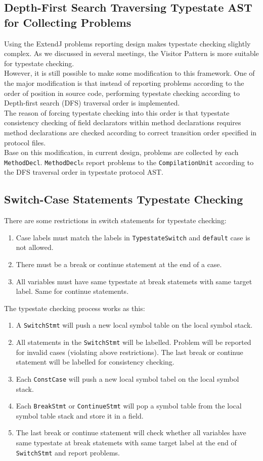 \documentclass[]{article}
\begin{document}
\subsection{Depth-First Search Traversing Typestate AST for Collecting Problems}
Using the ExtendJ problems reporting design makes typestate checking slightly complex. As we discussed in several meetings, the Visitor Pattern is more suitable for typestate checking. \\[0.2cm]
However, it is still possible to make some modification to this framework. One of the major modification is that instead of reporting problems according to the order of position in source code, performing typestate checking according to Depth-first search (DFS) traversal order is implemented. \\[0.2cm]
The reason of forcing typestate checking into this order is that typestate consistency checking of field declarators within method declarations requires method declarations are checked according to correct transition order specified in protocol files. \\[0.2cm]
Base on this modification, in current design, problems are collected by each \texttt{MethodDecl}. \texttt{MethodDecl}s report problems to the \texttt{CompilationUnit} according to the DFS traversal order in typestate protocol AST. 

\subsection{Switch-Case Statements Typestate Checking}
There are some restrictions in switch statements for typestate checking:
\begin{enumerate}
	\item Case labels must match the labels in \texttt{TypestateSwitch} and \texttt{default} case is not allowed.
	\item There must be a break or continue statement at the end of a case.
	\item All variables must have same typestate at break statemets with same target label. Same for continue statements.
\end{enumerate}
The typestate checking process works as this:
\begin{enumerate}
	\item A \texttt{SwitchStmt} will push a new local symbol table on the local symbol stack.
	\item All statements in the \texttt{SwitchStmt} will be labelled. Problem will be reported for invalid cases (violating above restrictions). The last break or continue statement will be labelled for consistency checking.
	\item Each \texttt{ConstCase} will push a new local symbol tabel on the local symbol stack.
	\item Each \texttt{BreakStmt} or \texttt{ContinueStmt} will pop a symbol table from the local symbol table stack and store it in a field.
	\item The last break or continue statement will check whether all variables have same typestate at break statemets with same target label at the end of \texttt{SwitchStmt} and report problems.
\end{enumerate}
\end{document}
